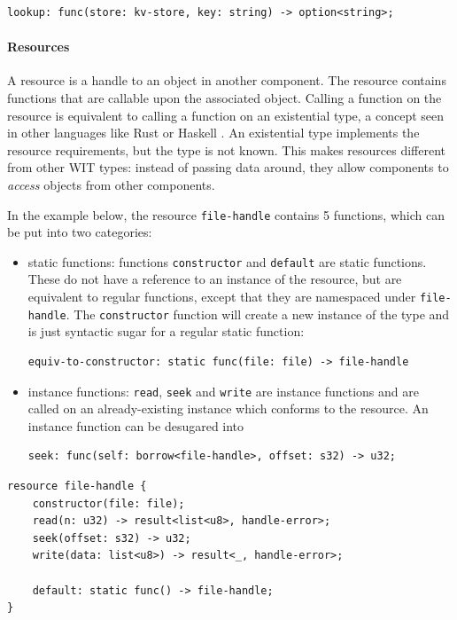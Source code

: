\begin{verbatim}
lookup: func(store: kv-store, key: string) -> option<string>;
\end{verbatim}

\paragraph{Resources}
A resource is a handle to an object in another component. The resource contains functions that are callable upon the associated object. Calling a function on the resource is equivalent to calling a function on an existential type, a concept seen in other languages like Rust or Haskell \cite{haskell_existential}. An existential type implements the resource requirements, but the type is not known. This makes resources different from other WIT types: instead of passing data around, they allow components to \textit{access} objects from other components.

In the example below, the resource \texttt{file-handle} contains 5 functions, which can be put into two categories:
\begin{itemize}

\item static functions: functions \texttt{constructor} and \texttt{default} are static functions. These do not have a reference to an instance of the resource, but are equivalent to regular functions, except that they are namespaced under \texttt{file-handle}. The \texttt{constructor} function will create a new instance of the type and is just syntactic sugar for a regular static function:
\begin{verbatim}
equiv-to-constructor: static func(file: file) -> file-handle
\end{verbatim}

\item instance functions: \texttt{read}, \texttt{seek} and \texttt{write} are instance functions and are called on an already-existing instance which conforms to the resource. An instance function can be desugared into
\begin{verbatim}
seek: func(self: borrow<file-handle>, offset: s32) -> u32;
\end{verbatim}

\end{itemize}

 
\begin{verbatim}
resource file-handle {
    constructor(file: file);
    read(n: u32) -> result<list<u8>, handle-error>;
    seek(offset: s32) -> u32;
    write(data: list<u8>) -> result<_, handle-error>;
    
    default: static func() -> file-handle;
}
\end{verbatim}


